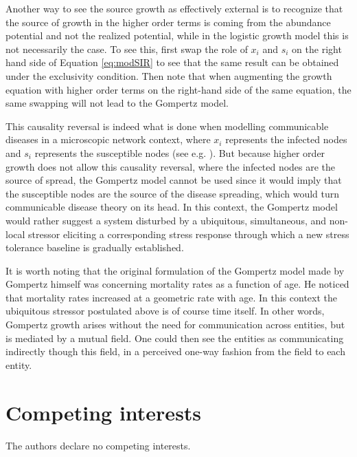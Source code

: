 \documentclass{article}
\begin{document}
Another way to see the source growth as effectively external is to recognize that the source of growth in the higher order terms is coming from the abundance potential and not the realized potential, while in the logistic growth model this is not necessarily the case. To see this, first swap the role of $x_i$ and $s_i$ on the right hand side of Equation \ref{eq:modSIR} to see that the same result can be obtained under the exclusivity condition. Then note that when augmenting the growth equation with higher order terms on the right-hand side of the same equation, the same swapping will not lead to the Gompertz model. 

This causality reversal is indeed what is done when modelling communicable diseases in a microscopic network context, where $x_i$ represents the infected nodes and $s_i$ represents the susceptible nodes (see e.g. \citet{estrada2022networked}). But because higher order growth does not allow this causality reversal, where the infected nodes are the source of spread, the Gompertz model cannot be used since it would imply that the susceptible nodes are the source of the disease spreading, which would turn communicable disease theory on its head. In this context, the Gompertz model would rather suggest a system disturbed by a ubiquitous, simultaneous, and non-local stressor eliciting a corresponding stress response through which a new stress tolerance baseline is gradually established.

It is worth noting that the original formulation of the Gompertz model made by Gompertz himself was concerning mortality rates as a function of age. He noticed that mortality rates increased at a geometric rate with age. In this context the ubiquitous stressor postulated above is of course time itself. In other words, Gompertz growth arises without the need for communication across entities, but is mediated by a mutual field. One could then see the entities as communicating indirectly though this field, in a perceived one-way fashion from the field to each entity. 

\section*{Competing interests}
The authors declare no competing interests.

\end{document}
